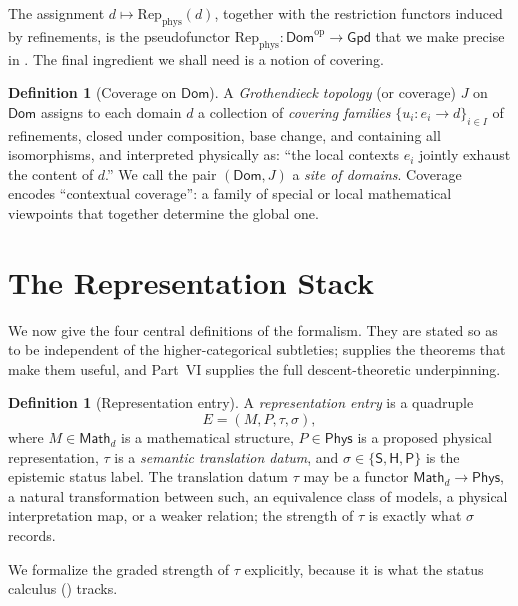 \documentclass[12pt]{article}
\theoremstyle{definition}
\newtheorem{definition}[theorem]{Definition}
\theoremstyle{remark}
\newcommand{\Dom}{\mathsf{Dom}}
\newcommand{\Math}{\mathsf{Math}}
\newcommand{\Phys}{\mathsf{Phys}}
\newcommand{\Gpd}{\mathsf{Gpd}}
\newcommand{\Repphys}{\mathrm{Rep}_{\mathrm{phys}}}
\newcommand{\op}{\mathrm{op}}
\newcommand{\Sstat}{\mathsf{S}}
\newcommand{\Hstat}{\mathsf{H}}
\newcommand{\Pstat}{\mathsf{P}}
\begin{document}
The assignment $d \mapsto \Repphys(d)$, together with the restriction functors
induced by refinements, is the pseudofunctor
$\Repphys : \Dom^{\op} \to \Gpd$ that we make precise in . The
final ingredient we shall need is a notion of covering.

\begin{definition}[Coverage on $\Dom$]
\label{def:coverage}
A \emph{Grothendieck topology} (or coverage) $J$ on $\Dom$ assigns to each domain
$d$ a collection of \emph{covering families} $\{u_i : e_i \to d\}_{i \in I}$ of
refinements, closed under composition, base change, and containing all
isomorphisms, and interpreted physically as: ``the local contexts $e_i$ jointly
exhaust the content of $d$.'' We call the pair $(\Dom, J)$ a \emph{site of
domains}. Coverage encodes ``contextual coverage'': a family of special or local
mathematical viewpoints that together determine the global one.
\end{definition}

\section{The Representation Stack}
\label{sec:stack}

We now give the four central definitions of the formalism. They are stated
so as to be independent of the higher-categorical subtleties; 
supplies the theorems that make them useful, and Part~VI supplies the full
descent-theoretic underpinning.

\begin{definition}[Representation entry]
\label{def:entry}
A \emph{representation entry} is a quadruple
\[
  E = (M, P, \tau, \sigma),
\]
where $M \in \Math_d$ is a mathematical structure, $P \in \Phys$ is a proposed
physical representation, $\tau$ is a \emph{semantic translation datum}, and
$\sigma \in \{\Sstat, \Hstat, \Pstat\}$ is the epistemic status label. The
translation datum $\tau$ may be a functor $\Math_d \to \Phys$, a natural
transformation between such, an equivalence class of models, a physical
interpretation map, or a weaker relation; the strength of $\tau$ is exactly what
$\sigma$ records.
\end{definition}

We formalize the graded strength of $\tau$ explicitly, because it is what the
status calculus () tracks.
\end{document}
